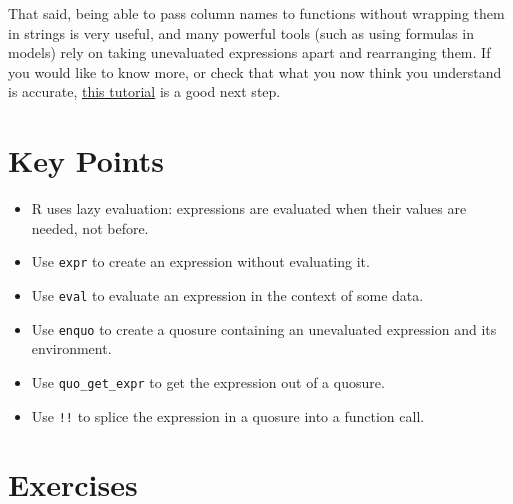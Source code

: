 \noindent
That said,
being able to pass column names to functions without wrapping them in strings is very useful,
and many powerful tools (such as using formulas in models)
rely on taking unevaluated expressions apart and rearranging them.
If you would like to know more,
or check that what you now think you understand is accurate,
\href{https://ijlyttle.shinyapps.io/tidyeval/}{this tutorial} is a good next step.

\section{Key Points}

\begin{itemize}
\item
  R uses lazy evaluation: expressions are evaluated when their values are needed, not before.
\item
  Use \texttt{expr} to create an expression without evaluating it.
\item
  Use \texttt{eval} to evaluate an expression in the context of some data.
\item
  Use \texttt{enquo} to create a quosure containing an unevaluated expression and its environment.
\item
  Use \texttt{quo\_get\_expr} to get the expression out of a quosure.
\item
  Use \texttt{!!} to splice the expression in a quosure into a function call.
\end{itemize}

\section{Exercises}


